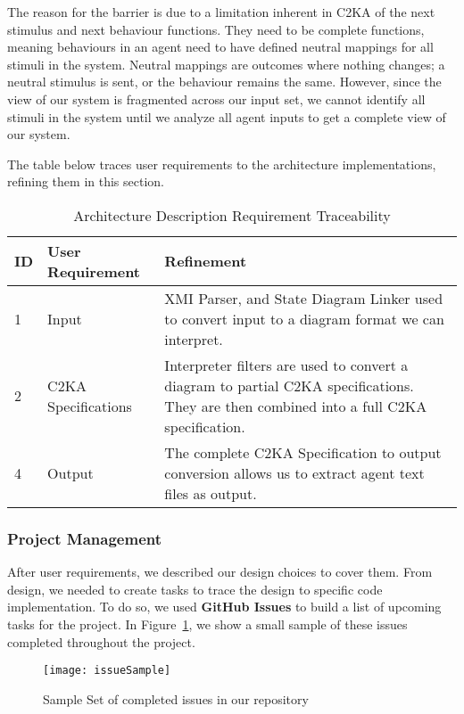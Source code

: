 The reason for the barrier is due to a limitation inherent in C2KA of the next stimulus and next behaviour functions.
They need to be complete functions,
meaning behaviours in an agent need to have defined neutral mappings for all stimuli in the system.
Neutral mappings are outcomes where nothing changes; a neutral stimulus is sent, or the behaviour remains the same.
However, since the view of our system is fragmented across our input set,
we cannot identify all stimuli in the system until we analyze all agent inputs to get a complete view of our system.


The table below traces user requirements to the architecture implementations, refining them in this section.
\begin{table}[htbp]
    \centering
    \caption{Architecture Description Requirement Traceability}\label{tab:arch-description-table}
    \begin{tabularx}{\textwidth}{| l | l | X |}
        \hline
        \textbf{ID} & \textbf{User Requirement} & \textbf{Refinement} \\
        \hline
        1 & Input & XMI Parser, and State Diagram Linker used to convert input to a diagram format we can interpret. \\ \hline
        2 & C2KA Specifications & Interpreter filters are used to convert a diagram to partial C2KA specifications.
        They are then combined into a full C2KA specification. \\ \hline
        4 & Output & The complete C2KA Specification to output conversion allows us to extract agent text files as output.  \\ \hline
    \end{tabularx}
\end{table}

\newpage
\subsubsection{Project Management}\label{subsubsec:proj-mngmnt}
After user requirements, we described our design choices to cover them.
From design, we needed to create tasks to trace the design to specific code implementation.
To do so, we used \textbf{GitHub Issues} to build a list of upcoming tasks for the project.
In Figure~\ref{fig:sampleIssueList}, we show a small sample of these issues completed throughout the project.
\begin{figure}[ht]
    \centering
    \texttt{[image: issueSample]}
    \caption{Sample Set of completed issues in our repository}
    \label{fig:sampleIssueList}
\end{figure}

